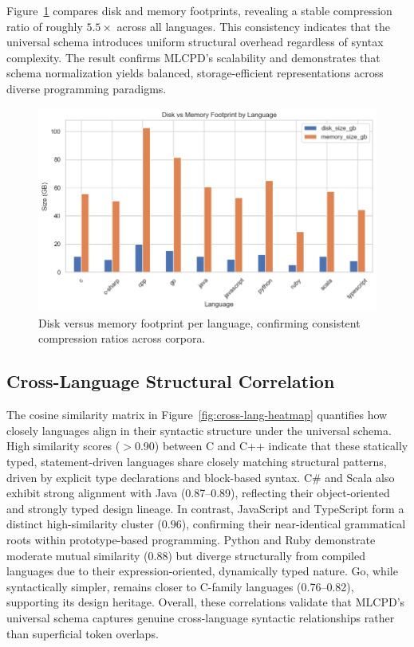 \documentclass{article}
\begin{document}
Figure~\ref{fig:disk-memory} compares disk and memory footprints, revealing a stable compression ratio of roughly $5.5\times$ across all languages. This consistency indicates that the universal schema introduces uniform structural overhead regardless of syntax complexity. The result confirms MLCPD’s scalability and demonstrates that schema normalization yields balanced, storage-efficient representations across diverse programming paradigms.

\begin{figure}[H]
\centering
\includegraphics[width=0.75\linewidth]{disk_vs_memory_by _language.png}
\caption{Disk versus memory footprint per language, confirming consistent compression ratios across corpora.}
\label{fig:disk-memory}
\end{figure}

\subsection{Cross-Language Structural Correlation}
The cosine similarity matrix in Figure~\ref{fig:cross-lang-heatmap} quantifies how closely languages align in their syntactic structure under the universal schema. High similarity scores ($>$0.90) between C and C++ indicate that these statically typed, statement-driven languages share closely matching structural patterns, driven by explicit type declarations and block-based syntax. C\# and Scala also exhibit strong alignment with Java (0.87–0.89), reflecting their object-oriented and strongly typed design lineage.  
In contrast, JavaScript and TypeScript form a distinct high-similarity cluster ($0.96$), confirming their near-identical grammatical roots within prototype-based programming. Python and Ruby demonstrate moderate mutual similarity ($0.88$) but diverge structurally from compiled languages due to their expression-oriented, dynamically typed nature. Go, while syntactically simpler, remains closer to C-family languages (0.76–0.82), supporting its design heritage. Overall, these correlations validate that MLCPD’s universal schema captures genuine cross-language syntactic relationships rather than superficial token overlaps.
\end{document}
